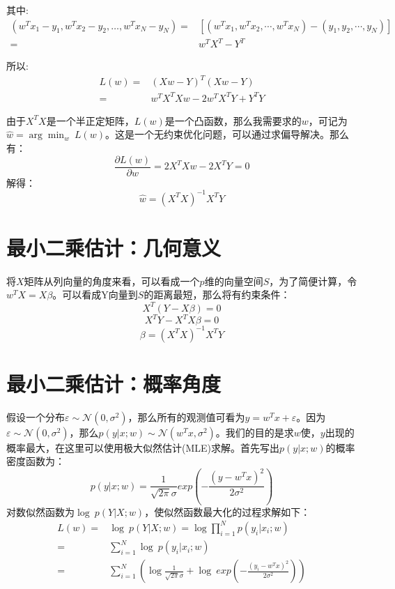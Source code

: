 \documentclass[a4paper]{article}
\numberwithin{equation}{section}
\begin{document}
其中:
\begin{align}
    (w^T x_1-y_1, w^T x_2-y_2, \dots, w^T x_N-y_N) = & [(w^Tx_1, w^Tx_2, \cdots, w^Tx_N)-(y_1,y_2,\cdots,y_N)] \\
    \nonumber = & w^TX^T-Y^T
\end{align}

所以:
\begin{align}
    L(w) = & (Xw-Y)^T(Xw-Y) \\
    \nonumber = & w^TX^TXw - 2w^TX^TY + Y^TY
\end{align}

由于$X^TX$是一个半正定矩阵，$L(w)$是一个凸函数，那么我需要求的$w$，可记为$\hat{w}=\arg \min_{w} \ L(w)$。这是一个无约束优化问题，可以通过求偏导解决。那么有：
\begin{equation}
    \frac{\partial L(w)}{\partial w}=2X^TXw-2X^TY=0
\end{equation}
解得：
\begin{equation}
    \hat{w}=(X^TX)^{-1}X^TY
\end{equation}
    

\section{最小二乘估计：几何意义}
将$X$矩阵从列向量的角度来看，可以看成一个$p$维的向量空间$S$，为了简便计算，令$w^TX=X\beta$。可以看成Y向量到$S$的距离最短，那么将有约束条件：
\begin{equation}
    X^T(Y-X\beta) = 0
\end{equation}
\begin{equation}
    X^TY-X^TX\beta=0
\end{equation}
\begin{equation}
    \beta=(X^TX)^{-1}X^TY
\end{equation}

\section{最小二乘估计：概率角度}
假设一个分布$\varepsilon \sim \mathcal{N}(0,\sigma^2)$，那么所有的观测值可看为$y = w^Tx + \varepsilon$。因为$\varepsilon \sim \mathcal{N}(0,\sigma^2)$，那么$p(y|x;w) \sim \mathcal{N}(w^Tx, \sigma^2)$。我们的目的是求$w$使，$y$出现的概率最大，在这里可以使用极大似然估计(MLE)求解。首先写出$p(y|x;w)$的概率密度函数为：
\begin{equation}
    p(y|x;w)=\frac{1}{\sqrt{2\pi}\sigma}exp\left(-\frac{(y-w^Tx)^2}{2\sigma^2}\right)
\end{equation}
对数似然函数为$\log\ p(Y|X;w)$，使似然函数最大化的过程求解如下：
\begin{align}
    L(w) = & \log\ p(Y|X;w) = \log\prod_{i=1}^Np(y_i|x_i;w) \\
         = & \sum_{i=1}^N\log\ p(y_i|x_i;w) \\ 
         = & \sum_{i=1}^N \left( \log\frac{1}{\sqrt{2\pi}\sigma} + \log\ exp\left( -\frac{(y_i - w^Tx)^2}{2\sigma^2} \right) \right)
\end{align}
\end{document}
